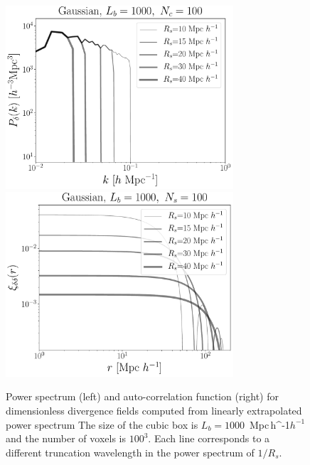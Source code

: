 \documentclass[usenatbib]{mnras}
\newcommand{\Mpch}{\,{\rm Mpc}\,\ifmmode h^{-1}\else $h^{-1}$\fi}
\begin{document}
\begin{figure}
    \centering
    \includegraphics[width=240pt]{power_spectrum_gauss_1000_100.pdf}
    \includegraphics[width=240pt]{corr_func_gauss_1000_100.pdf}
    \caption{Power spectrum (left) and auto-correlation function (right) for dimensionless divergence fields computed from linearly extrapolated power spectrum
    The size of the cubic box is $L_b=1000$ \Mpch and the number of voxels is $100^3$.
    Each line corresponds to a different truncation wavelength in the power spectrum of $1/R_s$.
    \label{fig:gaussian}}
\end{figure}
\end{document}
